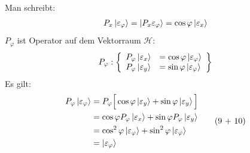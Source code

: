 \documentclass[a4paper]{scrartcl}
\begin{document}
{Man schreibt:
\begin{align}
P_x \Ket{\varepsilon_\varphi } = \Ket{ P_x \varepsilon_\varphi} = \cos \varphi \Ket{ \varepsilon_x }
\end{align}
$P_\varphi$ ist Operator auf dem Vektorraum $\mathcal H$:
\begin{align}
P_\varphi: 
\left\{ 
\begin{array}{l l}
P_\varphi \Ket{\varepsilon_x } & = \cos \varphi \Ket{\varepsilon_\varphi} \\
P_\varphi \Ket{\varepsilon_y } & = \sin \varphi \Ket{\varepsilon_\varphi} 
\end{array}
\right\}
\end{align}
Es gilt:
\begin{align}
\begin{split}
P_\varphi \Ket{ \varepsilon_\varphi} & = P_\varphi \Big[ \cos \varphi \Ket{ \varepsilon_y } + \sin \varphi \Ket{ \varepsilon_y } \Big]  \\
& =  \cos \varphi P_\varphi \Ket{ \varepsilon_x } + \sin \varphi P_\varphi \Ket{ \varepsilon_y }  \\
& = \cos^2\varphi \Ket{\varepsilon_\varphi } + \sin^2 \varphi \Ket{ \varepsilon_\varphi }  \\
& = \Ket{ \varepsilon_\varphi } 
\end{split} \tag{9 + 10} 
\end{align}

\setcounter{equation}{10}
}
\end{document}
